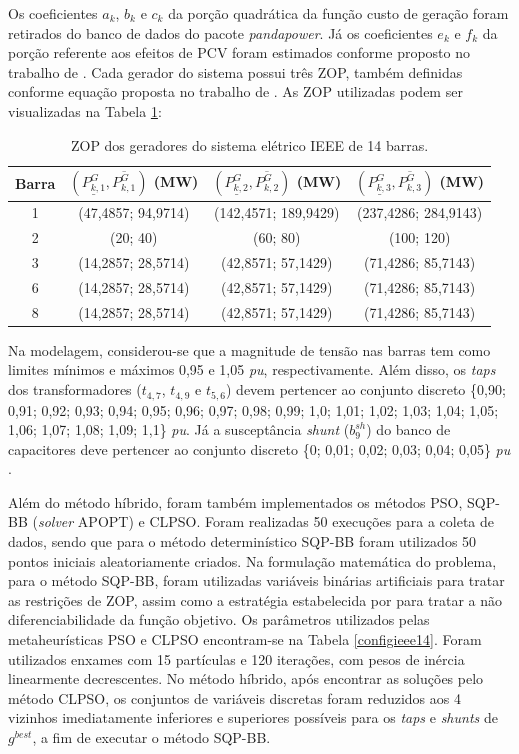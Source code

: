 \documentclass[
	12pt,				%
	openany,			%
	twoside,			%
	a4paper,			%
	chapter=TITLE,		%
	section=Title,		%
	subsection=Title,	%
	subsubsection=Title,%
	english,			%
	french,				%
	spanish,			%
	brazil			%
	]{abntex2}
\begin{document}
\begin{ERRATA}
Os coeficientes $a_k$, $b_k$ e $c_k$ da porção quadrática da função custo de geração foram retirados do banco de dados do pacote \emph{pandapower}. Já os coeficientes $e_k$ e $f_k$ da porção referente aos efeitos de PCV foram estimados conforme proposto no trabalho de . Cada gerador do sistema possui três ZOP, também definidas conforme equação proposta no trabalho de . As ZOP utilizadas podem ser visualizadas na Tabela \ref{ZOPieee14}:


\begin{table}[h]
\caption{\label{ZOPieee14}ZOP dos geradores do sistema elétrico IEEE de 14 barras.}
\center
\begin{tabular}{c c c c}
\hline
 \rule{0mm}{3ex} Barra  & $(\underline{P^G_{k,1}}, \overline{P^G_{k,1}})$ (MW) & $(\underline{P^G_{k,2}}, \overline{P^G_{k,2}})$ (MW)& $(\underline{P^G_{k,3}}, \overline{P^G_{k,3}})$ (MW)
 \\[2mm]
 \hline
 
1& (47,4857; 94,9714) & (142,4571; 189,9429) & (237,4286; 284,9143) \\
2& (20; 40) & (60; 80)& (100; 120) \\
3& (14,2857; 28,5714) & (42,8571; 57,1429)& (71,4286; 85,7143) \\
6& (14,2857; 28,5714) & (42,8571; 57,1429)& (71,4286; 85,7143) \\
8& (14,2857; 28,5714) & (42,8571; 57,1429)& (71,4286; 85,7143) \\
\hline
\end{tabular}
\end{table}

Na modelagem, considerou-se que a magnitude de tensão nas barras tem como
limites mínimos e máximos 0,95 e 1,05 \emph{pu}, respectivamente. Além disso, os \emph{taps} dos transformadores ($t_{4,7}$, $t_{4,9}$ e $t_{5,6}$) devem pertencer ao conjunto discreto \{0,90; 0,91; 0,92; 0,93; 0,94; 0,95; 0,96; 0,97; 0,98; 0,99; 1,0; 1,01; 1,02; 1,03; 1,04; 1,05; 1,06; 1,07; 1,08; 1,09; 1,1\} \emph{pu}. Já a susceptância \emph{shunt} ($b^{sh}_9$) do banco de capacitores deve pertencer ao conjunto discreto \{0; 0,01; 0,02; 0,03; 0,04; 0,05\} \emph{pu} \cite{antlion}.

Além do método híbrido, foram também implementados os métodos PSO, SQP-BB
(\emph{solver} APOPT) e CLPSO. Foram realizadas 50 execuções para a coleta de dados, sendo que para o método determinístico SQP-BB foram utilizados 50 pontos iniciais aleatoriamente criados. Na formulação matemática do problema, para o método SQP-BB, foram utilizadas variáveis binárias artificiais para tratar as restrições de ZOP, assim como a estratégia estabelecida por  para tratar a não diferenciabilidade da função objetivo. Os parâmetros utilizados pelas metaheurísticas PSO e CLPSO encontram-se na Tabela \ref{configieee14}. Foram utilizados enxames com 15 partículas e 120 iterações, com pesos de inércia linearmente decrescentes. No método híbrido, após encontrar as soluções pelo método CLPSO, os conjuntos de variáveis discretas foram reduzidos aos 4 vizinhos imediatamente inferiores e superiores possíveis para os \emph{taps} e \emph{shunts} de $g^{best}$, a fim de executar o método SQP-BB.



\end{ERRATA}
\end{document}
